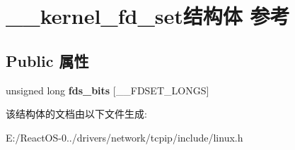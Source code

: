 \hypertarget{struct____kernel__fd__set}{}\section{\+\_\+\+\_\+kernel\+\_\+fd\+\_\+set结构体 参考}
\label{struct____kernel__fd__set}
\subsection*{Public 属性}
\begin{DoxyCompactItemize}
\item 
\mbox{\label{struct____kernel__fd__set_ad5bad99e1a2c40b305aa972307cbcaa5}} 
unsigned long {\bfseries fds\+\_\+bits} \mbox{[}\+\_\+\+\_\+\+F\+D\+S\+E\+T\+\_\+\+L\+O\+N\+GS\mbox{]}
\end{DoxyCompactItemize}


该结构体的文档由以下文件生成\+:\begin{DoxyCompactItemize}
\item 
E\+:/\+React\+O\+S-\/0../drivers/network/tcpip/include/linux.\+h\end{DoxyCompactItemize}
